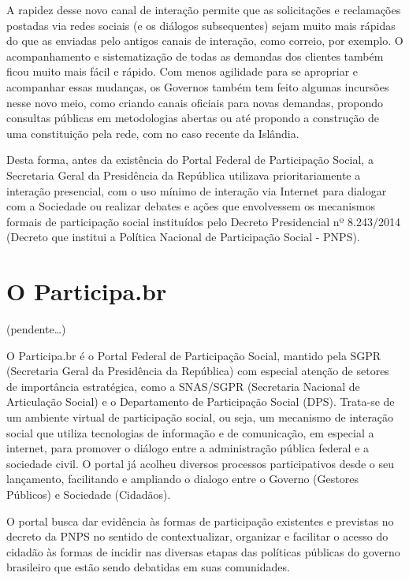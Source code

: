 \documentclass{article}
\begin{document}
A rapidez desse novo canal de interação permite que as solicitações e
reclamações postadas via redes sociais (e os diálogos subsequentes) sejam muito
mais rápidas do que as enviadas pelo antigos canais de interação, como correio,
por exemplo. O acompanhamento e sistematização de todas as demandas dos
clientes também ficou muito mais fácil e rápido. Com menos agilidade para se
apropriar e acompanhar essas mudanças, os Governos também tem feito algumas
incursões nesse novo meio, como criando canais oficiais para novas demandas,
propondo consultas públicas em metodologias abertas ou até propondo a
construção de uma constituição pela rede, com no caso recente da Islândia.

Desta forma, antes da existência do Portal Federal de Participação Social, a
Secretaria Geral da Presidência da República utilizava prioritariamente a
interação presencial, com o uso mínimo de interação via Internet para dialogar
com a Sociedade ou realizar debates e ações que envolvessem os mecanismos
formais de participação social instituídos pelo Decreto Presidencial nº
8.243/2014 (Decreto que institui a Política Nacional de Participação Social -
PNPS).

\section{O Participa.br}

(pendente\ldots)


O Participa.br é o Portal Federal de Participação Social, mantido pela SGPR
(Secretaria Geral da Presidência da República) com especial atenção de setores
de importância estratégica, como a SNAS/SGPR (Secretaria Nacional de
Articulação Social) e o Departamento de Participação Social (DPS). Trata-se de
um ambiente virtual de participação social, ou seja, um mecanismo de interação
social que utiliza tecnologias de informação e de comunicação, em especial a
internet, para promover o diálogo entre a administração pública federal e a
sociedade civil. O portal já acolheu diversos processos participativos desde o
seu lançamento, facilitando e ampliando o dialogo entre o Governo (Gestores
Públicos) e Sociedade (Cidadãos). 

O portal busca dar evidência às formas de participação existentes e previstas
no decreto da PNPS no sentido de contextualizar, organizar e facilitar o acesso
do cidadão às formas de incidir nas diversas etapas das políticas públicas do
governo brasileiro que estão sendo debatidas em suas comunidades.
\end{document}
